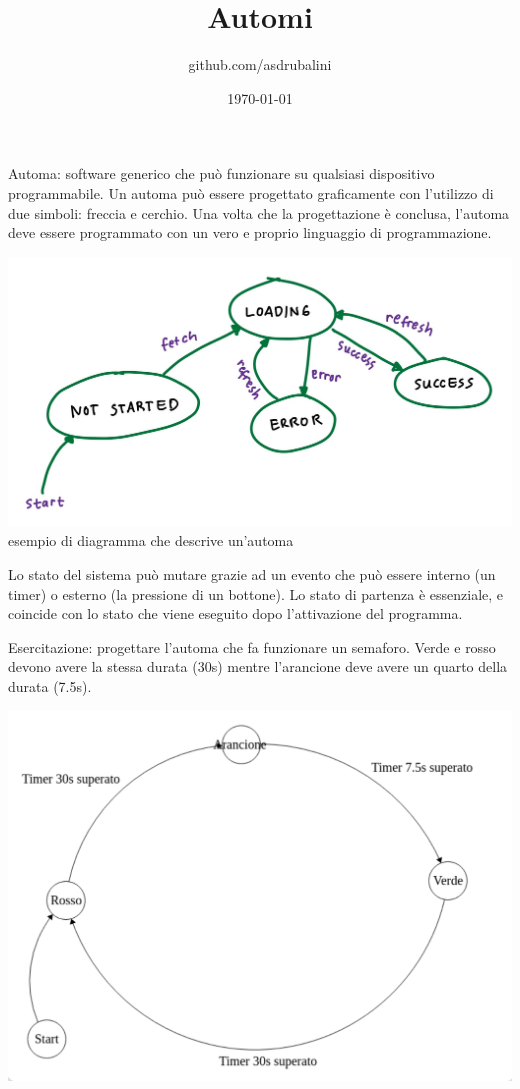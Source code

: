 \documentclass{article}
\title{Automi}
\author{github.com/asdrubalini}
\date{\today}
\begin{document}
    \maketitle

    Automa: software generico che può funzionare su qualsiasi dispositivo programmabile.
    Un automa può essere progettato graficamente con l'utilizzo di due simboli: freccia e cerchio.
    Una volta che la progettazione è conclusa, l'automa deve essere programmato con un vero e proprio linguaggio di programmazione.

    \begin{center}
        \includegraphics[width=\textwidth]{automa.png}
        esempio di diagramma che descrive un'automa
    \end{center}

    Lo stato del sistema può mutare grazie ad un evento che può essere interno (un timer) o esterno (la pressione di un bottone).
    Lo stato di partenza è essenziale, e coincide con lo stato che viene eseguito dopo l'attivazione del programma.

    \newpage

    Esercitazione: progettare l'automa che fa funzionare un semaforo.
    Verde e rosso devono avere la stessa durata (30s) mentre l'arancione deve avere un quarto della durata (7.5s). 

    \begin{center}
        \includegraphics[width=\textwidth]{semaforo.png}
    \end{center}
\end{document}
